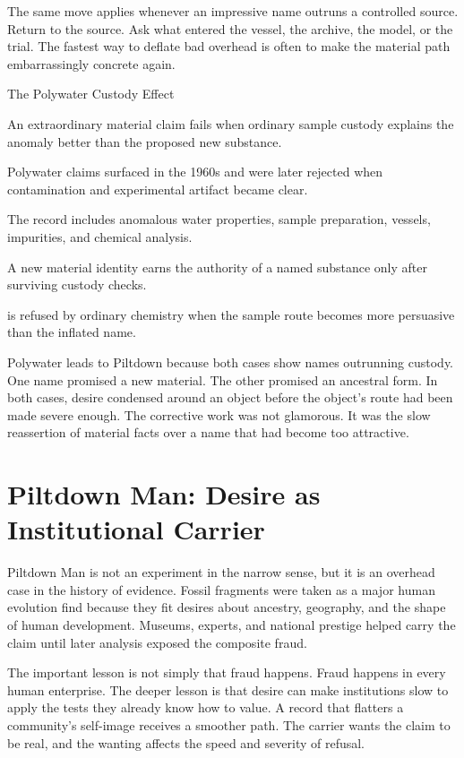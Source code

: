 The same move applies whenever an impressive name outruns a controlled
source. Return to the source. Ask what entered the vessel, the archive, the
model, or the trial. The fastest way to deflate bad overhead is often to make
the material path embarrassingly concrete again.

\begin{phenom}{The Polywater Custody Effect~\cite{franks1970}}
\label{ph:polywater-custody}

\PhStatement
An extraordinary material claim fails when ordinary sample custody explains
the anomaly better than the proposed new substance.

\PhOrigin
Polywater claims surfaced in the 1960s and were later rejected when
contamination and experimental artifact became clear.

\PhObservation
The record includes anomalous water properties, sample preparation, vessels,
impurities, and chemical analysis.

\PhConstraint
A new material identity earns the authority of a named substance only after
surviving custody checks.

\PhConsequence
{} is refused by ordinary chemistry when the sample route becomes
more persuasive than the inflated name.
\end{phenom}

Polywater leads to Piltdown because both cases show names outrunning custody.
One name promised a new material. The other promised an
ancestral form. In both cases, desire condensed around an object before the
object's route had been made severe enough. The corrective work was not
glamorous. It was the slow reassertion of material facts over a name that had
become too attractive.

\section{Piltdown Man: Desire as Institutional Carrier}

Piltdown Man is not an experiment in the narrow sense, but it is an overhead
case in the history of evidence. Fossil fragments were taken as a major human
evolution find because they fit desires about ancestry, geography, and the
shape of human development. Museums, experts, and national prestige helped
carry the claim until later analysis exposed the composite fraud.

The important lesson is not simply that fraud happens. Fraud happens in every
human enterprise. The deeper lesson is that desire can make institutions slow
to apply the tests they already know how to value. A record that flatters a
community's self-image receives a smoother path. The carrier wants the claim
to be real, and the wanting affects the speed and severity of refusal.


